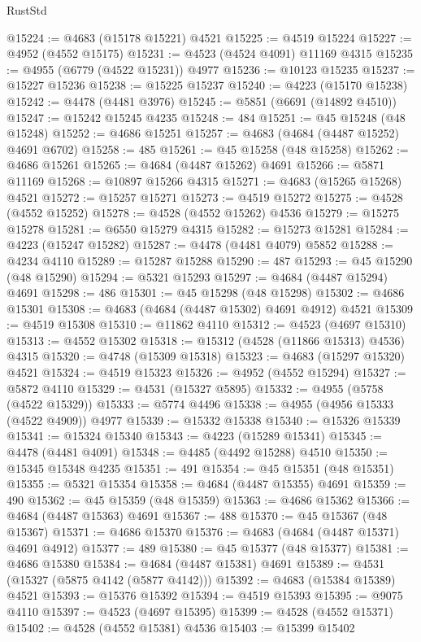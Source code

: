 \begin{lexlean}{RustStd}
\begin{coremodule}
@15224 := @4683 (@15178 @15221) @4521
@15225 := @4519 @15224
@15227 := @4952 (@4552 @15175)
@15231 := @4523 (@4524 @4091) @11169 @4315
@15235 := @4955 (@6779 (@4522 @15231)) @4977
@15236 := @10123 @15235
@15237 := @15227 @15236
@15238 := @15225 @15237
@15240 := @4223 (@15170 @15238)
@15242 := @4478 (@4481 @3976)
@15245 := @5851 (@6691 (@14892 @4510))
@15247 := @15242 @15245 @4235
@15248 := 484
@15251 := @45 @15248 (@48 @15248)
@15252 := @4686 @15251
@15257 := @4683 (@4684 (@4487 @15252) @4691 @6702)
@15258 := 485
@15261 := @45 @15258 (@48 @15258)
@15262 := @4686 @15261
@15265 := @4684 (@4487 @15262) @4691
@15266 := @5871 @11169
@15268 := @10897 @15266 @4315
@15271 := @4683 (@15265 @15268) @4521
@15272 := @15257 @15271
@15273 := @4519 @15272
@15275 := @4528 (@4552 @15252)
@15278 := @4528 (@4552 @15262) @4536
@15279 := @15275 @15278
@15281 := @6550 @15279 @4315
@15282 := @15273 @15281
@15284 := @4223 (@15247 @15282)
@15287 := @4478 (@4481 @4079) @5852
@15288 := @4234 @4110
@15289 := @15287 @15288
@15290 := 487
@15293 := @45 @15290 (@48 @15290)
@15294 := @5321 @15293
@15297 := @4684 (@4487 @15294) @4691
@15298 := 486
@15301 := @45 @15298 (@48 @15298)
@15302 := @4686 @15301
@15308 := @4683 (@4684 (@4487 @15302) @4691 @4912) @4521
@15309 := @4519 @15308
@15310 := @11862 @4110
@15312 := @4523 (@4697 @15310)
@15313 := @4552 @15302
@15318 := @15312 (@4528 (@11866 @15313) @4536) @4315
@15320 := @4748 (@15309 @15318)
@15323 := @4683 (@15297 @15320) @4521
@15324 := @4519 @15323
@15326 := @4952 (@4552 @15294)
@15327 := @5872 @4110
@15329 := @4531 (@15327 @5895)
@15332 := @4955 (@5758 (@4522 @15329))
@15333 := @5774 @4496
@15338 := @4955 (@4956 @15333 (@4522 @4909)) @4977
@15339 := @15332 @15338
@15340 := @15326 @15339
@15341 := @15324 @15340
@15343 := @4223 (@15289 @15341)
@15345 := @4478 (@4481 @4091)
@15348 := @4485 (@4492 @15288) @4510
@15350 := @15345 @15348 @4235
@15351 := 491
@15354 := @45 @15351 (@48 @15351)
@15355 := @5321 @15354
@15358 := @4684 (@4487 @15355) @4691
@15359 := 490
@15362 := @45 @15359 (@48 @15359)
@15363 := @4686 @15362
@15366 := @4684 (@4487 @15363) @4691
@15367 := 488
@15370 := @45 @15367 (@48 @15367)
@15371 := @4686 @15370
@15376 := @4683 (@4684 (@4487 @15371) @4691 @4912)
@15377 := 489
@15380 := @45 @15377 (@48 @15377)
@15381 := @4686 @15380
@15384 := @4684 (@4487 @15381) @4691
@15389 := @4531 (@15327 (@5875 @4142 (@5877 @4142)))
@15392 := @4683 (@15384 @15389) @4521
@15393 := @15376 @15392
@15394 := @4519 @15393
@15395 := @9075 @4110
@15397 := @4523 (@4697 @15395)
@15399 := @4528 (@4552 @15371)
@15402 := @4528 (@4552 @15381) @4536
@15403 := @15399 @15402

\end{coremodule}
\end{lexlean}

